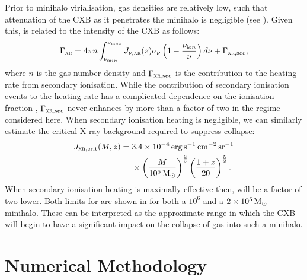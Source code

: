 \documentclass[../thesis.tex]{subfiles}
\begin{document}
Prior to minihalo virialisation, gas densities are relatively low, such that attenuation of the CXB as it penetrates the minihalo is negligible (see ). Given this, \gxr
is related to the intensity of the CXB as follows:
\begin{equation}
\Gamma_{\textsc{xr}} = 4\pi n \int_{\nu_{\mathrm min}}^{\nu_{\mathrm max}} J_{\nu, \textsc{xr}}(z) \sigma_{\nu}
\left(1 - \frac{\nu_{\mathrm ion}}{\nu} \right) d\nu + \Gamma_{\textsc{xr}, \mathrm sec},
\end{equation}
where $n$ is the gas number density and $\Gamma_{\textsc{xr}, \mathrm sec}$ is the contribution to the heating rate from secondary ionisation. While the contribution of secondary ionisation events to the heating rate has a complicated dependence on the ionisation fraction \citep[][see  for details]{ShullvanSteenberg1985}, $\Gamma_{\textsc{xr}, \mathrm sec}$ never enhances \gxr by more than a factor of two in the regime considered here.  When secondary ionisation heating is negligible, 
we can similarly estimate the critical X-ray background required to suppress collapse:
\begin{equation}
  \begin{split}
    J_{\textsc{xr}, \mathrm{crit}}(M,z) = \; & 3.4 \times 10^{-4} \,\mathrm{erg}\,\mathrm{s}^{-1} \,\mathrm{cm}^{-2} \,\mathrm{sr}^{-1}\\ &\times \left(\frac{M}{10^6\,\mathrm{M}_{\odot}}\right)^{\frac{2}{3}}
    \left(\frac{1+z}{20}\right)^{\frac{5}{2}}.
  \end{split}
\end{equation}
When secondary ionisation heating is maximally effective then, \jcrit will be a factor of two lower. Both limits for \jcrit are shown in  for both a $10^6$  and a $2\times10^5\,\mathrm{M}_{\odot}$ minihalo.  These can be interpreted as the approximate range in which the CXB will begin to have a significant impact on the collapse of gas into such a minihalo.


\section{Numerical Methodology}
\label{methods}
\end{document}

